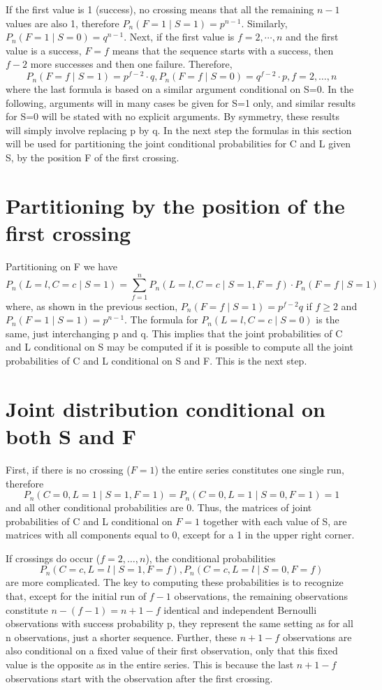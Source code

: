 If the first value is 1 (success), no crossing means that all the remaining $n-1$ values are also 1, therefore $P_n (F=1 \mid S=1) = p^{n-1}$. Similarly, $P_n(F=1 \mid S=0) = q^{n-1}$. Next, if the first value is $f=2, \cdots ,n$ and the first value is a success, $F=f$ means that the sequence starts with a success, then $f-2$ more successes and then one failure. Therefore, $$P_n (F=f \mid S=1) = p^{f-2} \cdot q, P_n (F=f \mid S=0) =q^{f-2} \cdot p, f=2, \ldots ,n$$
where the last formula is based on a similar argument conditional on S=0. In the following, arguments will in many cases be given for S=1 only, and similar results for S=0 will be stated with no explicit arguments. By symmetry, these results will simply involve replacing p by q. In the next step the formulas in this section will be used for partitioning the joint conditional probabilities for C and L given S, by the position F of the first crossing. 

\section{Partitioning by the position of the first crossing}

Partitioning on  F we have $$P_n (L=l,C=c \mid S=1) = \sum_{f=1}^n P_n(L=l,C=c \mid S=1,F=f) \cdot P_n (F=f \mid S=1)$$
where, as shown in the previous section,  $P_n (F=f \mid S=1) =p^{f-2}q$ if $f \geq 2$ and $P_n (F=1 \mid S=1) = p^{n-1}$. The formula for $P_n (L=l,C=c \mid S=0)$ is the same, just interchanging p and q. This implies that the joint probabilities of C and L conditional on S may be computed if it is possible to compute all the joint probabilities of C and L conditional on S and F. This is the next step.

\section{Joint distribution conditional on both S and F}

First, if there is no crossing ($F=1$) the entire series constitutes one single run, therefore $$P_n (C=0,L=1 \mid S=1,F=1)=P_n (C=0,L=1 \mid S=0,F=1)=1$$
and all other conditional probabilities are 0. Thus, the matrices of joint probabilities of C and L conditional on $F=1$ together with each value of S, are matrices with all components equal to 0, except for a 1 in the upper right corner.

If crossings do occur ($f=2, \ldots ,n$), the conditional probabilities $$P_n (C=c,L=l \mid S=1,F=f), P_n (C=c,L=l \mid S=0,F=f)$$ are more complicated. The key to computing these probabilities is to recognize that, except for the initial run of $f-1$ observations, the remaining observations constitute $n-(f-1)=n+1-f$ identical and independent Bernoulli observations with success probability p, they represent the same setting as for all n observations, just a shorter sequence. Further, these $n+1-f$ observations are also conditional on a fixed value of their first observation, only that this fixed value is the opposite as in the entire series. This is because the last $n+1-f$ observations start with the  observation after the first crossing. 

